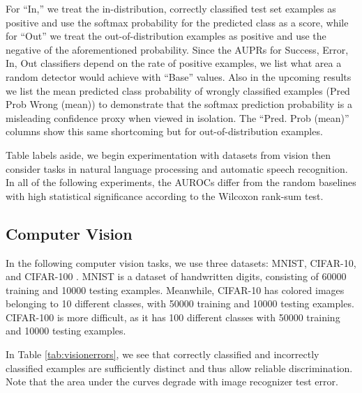 \documentclass{article}
\begin{document}
For ``In,'' we treat the in-distribution, correctly classified test set examples as positive and use the softmax probability for the predicted class as a score, while for ``Out'' we treat the out-of-distribution examples as positive and use the negative of the aforementioned probability. Since the AUPRs for Success, Error, In, Out classifiers depend on the rate of positive examples, we list what area a random detector would achieve with ``Base'' values. Also in the upcoming results we list the mean predicted class probability of wrongly classified examples (Pred Prob Wrong (mean)) to demonstrate that the softmax prediction probability is a misleading confidence proxy when viewed in isolation. The ``Pred. Prob (mean)'' columns show this same shortcoming but for out-of-distribution examples.

Table labels aside, we begin experimentation with datasets from vision then consider tasks in natural language processing and automatic speech recognition. In all of the following experiments, the AUROCs differ from the random baselines with high statistical significance according to the Wilcoxon rank-sum test.

\subsection{Computer Vision}
In the following computer vision tasks, we use three datasets: MNIST, CIFAR-10, and CIFAR-100 \citep{cifar}. MNIST is a dataset of handwritten digits, consisting of 60000 training and 10000 testing examples. Meanwhile, CIFAR-10 has colored images belonging to 10 different classes, with 50000 training and 10000 testing examples. CIFAR-100 is more difficult, as it has 100 different classes with 50000 training and 10000 testing examples.

In Table \ref{tab:visionerrors}, we see that correctly classified and incorrectly classified examples are sufficiently distinct and thus allow reliable discrimination. Note that the area under the curves degrade with image recognizer test error.
\end{document}
